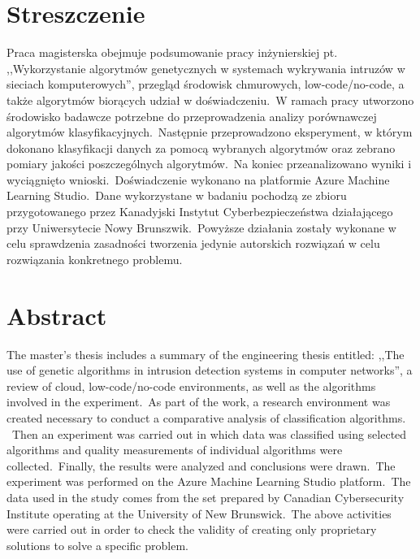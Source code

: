 \section*{Streszczenie}
Praca magisterska obejmuje podsumowanie pracy inżynierskiej pt. ,,Wykorzystanie algorytmów genetycznych w systemach wykrywania intruzów w sieciach komputerowych'', przegląd środowisk chmurowych, low-code/no-code, a także algorytmów biorących udział w doświadczeniu.\ W ramach pracy utworzono środowisko badawcze potrzebne do przeprowadzenia analizy porównawczej algorytmów klasyfikacyjnych.\ Następnie przeprowadzono eksperyment, w którym dokonano klasyfikacji danych za pomocą wybranych algorytmów oraz zebrano pomiary jakości poszczególnych algorytmów.\ Na koniec przeanalizowano wyniki i wyciągnięto wnioski.\ Doświadczenie wykonano na platformie Azure Machine Learning Studio.\ Dane wykorzystane w badaniu pochodzą ze zbioru przygotowanego przez Kanadyjski Instytut Cyberbezpieczeństwa działającego przy Uniwersytecie Nowy Brunszwik.\ Powyższe działania zostały wykonane w celu sprawdzenia zasadności tworzenia jedynie autorskich rozwiązań w celu rozwiązania konkretnego problemu.

\section*{Abstract}
The master's thesis includes a summary of the engineering thesis entitled: ,,The use of genetic algorithms in intrusion detection systems in computer networks'', a review of cloud, low-code/no-code environments, as well as the algorithms involved in the experiment.\ As part of the work, a research environment was created necessary to conduct a comparative analysis of classification algorithms. \ Then an experiment was carried out in which data was classified using selected algorithms and quality measurements of individual algorithms were collected.\ Finally, the results were analyzed and conclusions were drawn.\ The experiment was performed on the Azure Machine Learning Studio platform.\ The data used in the study comes from the set prepared by Canadian Cybersecurity Institute operating at the University of New Brunswick.\ The above activities were carried out in order to check the validity of creating only proprietary solutions to solve a specific problem.